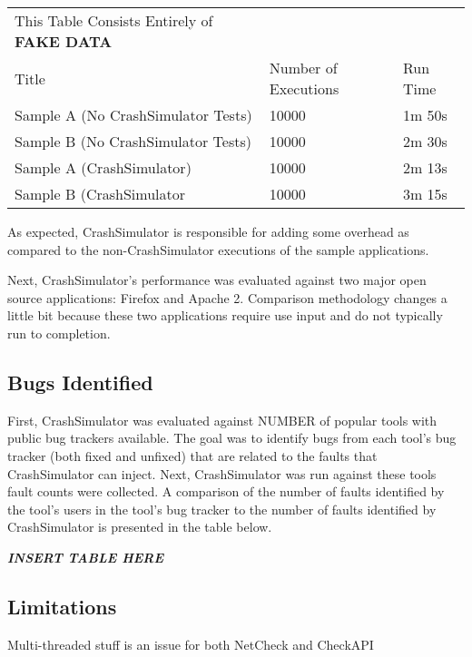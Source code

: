         \begin{tabular} {l | l | l}
            This Table Consists Entirely of \textbf{FAKE DATA} \\
            Title & Number of Executions & Run Time \\
            Sample A (No CrashSimulator Tests) & 10000 & 1m 50s \\
            Sample B (No CrashSimulator Tests) & 10000 & 2m 30s \\
            Sample A (CrashSimulator) & 10000 & 2m 13s \\
            Sample B (CrashSimulator & 10000 & 3m 15s \\
        \end{tabular}

        As expected, CrashSimulator is responsible for adding some overhead as compared to the non-CrashSimulator
        executions of the sample applications.


        Next, CrashSimulator's performance was evaluated against two major open source applications: Firefox and Apache
        2. Comparison methodology changes a little bit because these two applications require use input and do not
        typically run to completion.

    \subsection{Bugs Identified}

    First, CrashSimulator was evaluated against NUMBER of popular tools with public bug trackers available. The goal was
    to identify bugs from each tool's bug tracker (both fixed and unfixed) that are related to the faults that
    CrashSimulator can inject. Next, CrashSimulator was run against these tools fault counts were collected. A
    comparison of the number of faults identified by the tool's users in the tool's bug tracker to the number of faults
    identified by CrashSimulator is presented in the table below.

    \emph{\textbf{INSERT TABLE HERE}}

    \subsection{Limitations}

        Multi-threaded stuff is an issue for both NetCheck and CheckAPI

